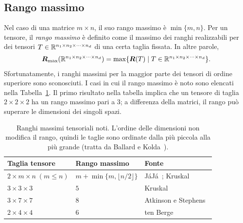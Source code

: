 \subsection*{Rango massimo}

Nel caso di una matrice $ m \times n $, il suo rango massimo è $ \min \{m,n\}  $. Per un tensore, il
\emph{rango massimo} è definito come il massimo dei ranghi realizzabili per dei tensori $ T \in
	\mathbb{R}^{n_1 \times n_2 \times  \cdots \times n_{d}} $ di una certa taglia fissata. In altre parole,
\begin{equation*}
	\bm{R}_{\text{max}}(\mathbb{R}^{n_1\times n_2 \times \cdots \times  n_{d}}) = \max \{ \bm{R}(T) \mid T \in
	\mathbb{R}^{n_1 \times n_2 \times \cdots \times n_{d}}\}.
\end{equation*}
Sfortunatamente, i ranghi massimi per la maggior parte dei
tensori di ordine superiore sono sconosciuti. I casi in cui il rango massimo è noto sono elencati
nella Tabella~\ref{tab:max_ranks}. Il primo risultato nella tabella implica che un tensore di taglia
$2 \times 2 \times 2$ ha un rango massimo pari a $3$; a differenza della matrici, il rango può
superare le dimensioni dei singoli spazi.

\begin{table}[htbp]
	\centering
	\small
	\caption{Ranghi massimi tensoriali noti. L'ordine delle dimensioni non modifica il rango, quindi le taglie sono ordinate dalla più piccola alla più grande (tratta da Ballard e Kolda~\cite[Tabella~16.1]{BK25}).}
	\label{tab:max_ranks}
	\begin{tabular}{lll}
		\toprule
		Taglia tensore                     & Rango massimo                           & Fonte                                            \\
		\midrule
		$2 \times m \times n \; (m \le n)$ & $m + \min \{ m, \lfloor n/2 \rfloor \}$ & JáJá~\cite{jaja1979}; Kruskal~\cite{kruskal1989} \\
		$3 \times 3 \times 3$              & $5$                                     & Kruskal~\cite{kruskal1989}                       \\
		$3 \times 7 \times 7$              & $8$                                     & Atkinson e Stephens~\cite{atkinson1979}          \\
		$2 \times 4 \times 4$              & $6$                                     & ten Berge~\cite{tenberge2000b}                   \\
		\bottomrule
	\end{tabular}
\end{table}

